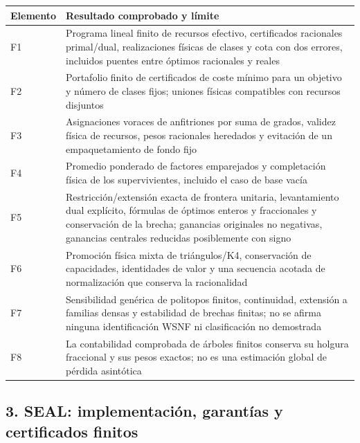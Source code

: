 \documentclass[spanish,11pt,a4paper]{article}
\newcounter{none}
\begin{document}
{\def\LTcaptype{none} %
\begin{longtable}[]{@{}
  >{\raggedright\arraybackslash}p{}
  >{\raggedright\arraybackslash}p{}@{}}
\toprule\noalign{}
\begin{minipage}[b]{\linewidth}\raggedright
Elemento
\end{minipage} & \begin{minipage}[b]{\linewidth}\raggedright
Resultado comprobado y límite
\end{minipage} \\
\midrule\noalign{}
\endhead
\bottomrule\noalign{}
\endlastfoot
F1 & Programa lineal finito de recursos efectivo, certificados
racionales primal/dual, realizaciones físicas de clases y cota con dos
errores, incluidos puentes entre óptimos racionales y reales \\
F2 & Portafolio finito de certificados de coste mínimo para un objetivo
y número de clases fijos; uniones físicas compatibles con recursos
disjuntos \\
F3 & Asignaciones voraces de anfitriones por suma de grados, validez
física de recursos, pesos racionales heredados y evitación de un
empaquetamiento de fondo fijo \\
F4 & Promedio ponderado de factores emparejados y completación física de
los supervivientes, incluido el caso de base vacía \\
F5 & Restricción/extensión exacta de frontera unitaria, levantamiento
dual explícito, fórmulas de óptimos enteros y fraccionales y
conservación de la brecha; ganancias originales no negativas, ganancias
centrales reducidas posiblemente con signo \\
F6 & Promoción física mixta de triángulos/K4, conservación de
capacidades, identidades de valor y una secuencia acotada de
normalización que conserva la racionalidad \\
F7 & Sensibilidad genérica de politopos finitos, continuidad, extensión
a familias densas y estabilidad de brechas finitas; no se afirma ninguna
identificación WSNF ni clasificación no demostrada \\
F8 & La contabilidad comprobada de árboles finitos conserva su holgura
fraccional y sus pesos exactos; no es una estimación global de pérdida
asintótica \\
\end{longtable}
}

\subsection{3. SEAL: implementación, garantías y certificados
finitos}\label{seal-implementaciuxf3n-garantuxedas-y-certificados-finitos}
\end{document}
